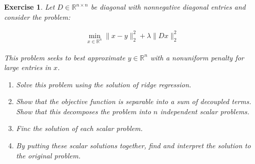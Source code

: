 \documentclass[12pt]{article}
\theoremstyle{colon}
\newtheorem{exercise}{Exercise}
\begin{document}
\begin{exercise}
  Let $D \in \mathbb{R}^{n \times n}$ be diagonal with nonnegative diagonal entries and consider the problem:

  \begin{gather*}
    \min_{x \in \mathbb{R}^n} \lVert x - y \rVert_2^2 + \lambda \lVert D x \rVert_2^2
  \end{gather*}

  This problem seeks to best approximate $y \in \mathbb{R}^n$ with a nonuniform penalty for large entries in $x$.

  \begin{enumerate}[label=\alph*)]
    \item Solve this problem using the solution of ridge regression.
    \item Show that the objective function is separable into a sum of decoupled terms. Show that this decomposes the problem into $n$ independent scalar problems.
    \item Finc the solution of each scalar problem.
    \item By putting these scalar solutions together, find and interpret the solution to the original problem.
  \end{enumerate}
\end{exercise}
\end{document}
